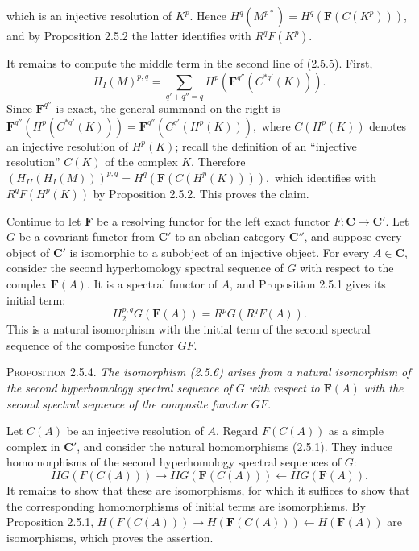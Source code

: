 
\noindent which is an injective resolution of $K^p$. Hence
$H^q(M^{p*})=H^q(\mathbf F(C(K^p)))$, and by Proposition 2.5.2 the latter
identifies with $R^qF(K^p)$.

It remains to compute the middle term in the second line of (2.5.5). First,
\[
H_I(M)^{p,q}
=\sum_{q'+q''=q}H^p(\mathbf F^{q''}(C^{*q'}(K))).
\]
Since $\mathbf F^{q''}$ is exact, the general summand on the right is
$\mathbf F^{q''}(H^p(C^{*q'}(K)))
=\mathbf F^{q''}(C^{q'}(H^p(K))),$
where $C(H^p(K))$ denotes an injective resolution of $H^p(K)$; recall the
definition of an \textquotedblleft injective resolution\textquotedblright{}
$C(K)$ of the complex $K$. Therefore
$(H_{II}(H_I(M)))^{p,q}
=H^q(\mathbf F(C(H^p(K)))),$
which identifies with $R^qF(H^p(K))$ by Proposition 2.5.2. This proves the
claim.

Continue to let $\mathbf F$ be a resolving functor for the left exact functor
$F:\mathbf C\to \mathbf C'$. Let $G$ be a covariant functor from $\mathbf C'$ to an
abelian category $\mathbf C''$, and suppose every object of $\mathbf C'$ is isomorphic to a
subobject of an injective object. For every $A\in \mathbf C$, consider the second
hyperhomology spectral sequence of $G$ with respect to the complex
$\mathbf F(A)$. It is a spectral functor of $A$, and Proposition 2.5.1 gives
its initial term:
\[
\tag{2.5.6}
II_2^{p,q}G(\mathbf F(A))=R^pG(R^qF(A)).
\]
This is a natural isomorphism with the initial term of the second spectral
sequence of the composite functor $GF$.

\textsc{Proposition 2.5.4.} \textit{The isomorphism \textup{(2.5.6)}
arises from a natural isomorphism of the second hyperhomology spectral
sequence of $G$ with respect to $\mathbf F(A)$ with the second spectral
sequence of the composite functor $GF$.}

Let $C(A)$ be an injective resolution of $A$. Regard $F(C(A))$ as a simple
complex in $\mathbf C'$, and consider the natural homomorphisms (2.5.1). They induce
homomorphisms of the second hyperhomology spectral sequences of $G$:
\[
IIG(F(C(A)))\to IIG(\mathbf F(C(A)))
\leftarrow IIG(\mathbf F(A)).
\]
It remains to show that these are isomorphisms, for which it suffices to show
that the corresponding homomorphisms of initial terms are isomorphisms. By
Proposition 2.5.1,
$H(F(C(A)))\to H(\mathbf F(C(A)))\leftarrow H(\mathbf F(A))$
are isomorphisms, which proves the assertion.

